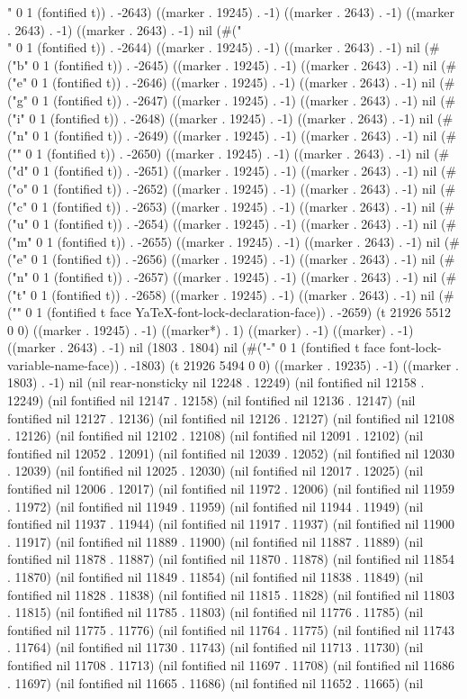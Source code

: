 " 0 1 (fontified t)) . -2643) ((marker . 19245) . -1) ((marker . 2643) . -1) ((marker . 2643) . -1) ((marker . 2643) . -1) nil (#("\\" 0 1 (fontified t)) . -2644) ((marker . 19245) . -1) ((marker . 2643) . -1) nil (#("b" 0 1 (fontified t)) . -2645) ((marker . 19245) . -1) ((marker . 2643) . -1) nil (#("e" 0 1 (fontified t)) . -2646) ((marker . 19245) . -1) ((marker . 2643) . -1) nil (#("g" 0 1 (fontified t)) . -2647) ((marker . 19245) . -1) ((marker . 2643) . -1) nil (#("i" 0 1 (fontified t)) . -2648) ((marker . 19245) . -1) ((marker . 2643) . -1) nil (#("n" 0 1 (fontified t)) . -2649) ((marker . 19245) . -1) ((marker . 2643) . -1) nil (#("{" 0 1 (fontified t)) . -2650) ((marker . 19245) . -1) ((marker . 2643) . -1) nil (#("d" 0 1 (fontified t)) . -2651) ((marker . 19245) . -1) ((marker . 2643) . -1) nil (#("o" 0 1 (fontified t)) . -2652) ((marker . 19245) . -1) ((marker . 2643) . -1) nil (#("c" 0 1 (fontified t)) . -2653) ((marker . 19245) . -1) ((marker . 2643) . -1) nil (#("u" 0 1 (fontified t)) . -2654) ((marker . 19245) . -1) ((marker . 2643) . -1) nil (#("m" 0 1 (fontified t)) . -2655) ((marker . 19245) . -1) ((marker . 2643) . -1) nil (#("e" 0 1 (fontified t)) . -2656) ((marker . 19245) . -1) ((marker . 2643) . -1) nil (#("n" 0 1 (fontified t)) . -2657) ((marker . 19245) . -1) ((marker . 2643) . -1) nil (#("t" 0 1 (fontified t)) . -2658) ((marker . 19245) . -1) ((marker . 2643) . -1) nil (#("}" 0 1 (fontified t face YaTeX-font-lock-declaration-face)) . -2659) (t 21926 5512 0 0) ((marker . 19245) . -1) ((marker*) . 1) ((marker) . -1) ((marker) . -1) ((marker . 2643) . -1) nil (1803 . 1804) nil (#("-" 0 1 (fontified t face font-lock-variable-name-face)) . -1803) (t 21926 5494 0 0) ((marker . 19235) . -1) ((marker . 1803) . -1) nil (nil rear-nonsticky nil 12248 . 12249) (nil fontified nil 12158 . 12249) (nil fontified nil 12147 . 12158) (nil fontified nil 12136 . 12147) (nil fontified nil 12127 . 12136) (nil fontified nil 12126 . 12127) (nil fontified nil 12108 . 12126) (nil fontified nil 12102 . 12108) (nil fontified nil 12091 . 12102) (nil fontified nil 12052 . 12091) (nil fontified nil 12039 . 12052) (nil fontified nil 12030 . 12039) (nil fontified nil 12025 . 12030) (nil fontified nil 12017 . 12025) (nil fontified nil 12006 . 12017) (nil fontified nil 11972 . 12006) (nil fontified nil 11959 . 11972) (nil fontified nil 11949 . 11959) (nil fontified nil 11944 . 11949) (nil fontified nil 11937 . 11944) (nil fontified nil 11917 . 11937) (nil fontified nil 11900 . 11917) (nil fontified nil 11889 . 11900) (nil fontified nil 11887 . 11889) (nil fontified nil 11878 . 11887) (nil fontified nil 11870 . 11878) (nil fontified nil 11854 . 11870) (nil fontified nil 11849 . 11854) (nil fontified nil 11838 . 11849) (nil fontified nil 11828 . 11838) (nil fontified nil 11815 . 11828) (nil fontified nil 11803 . 11815) (nil fontified nil 11785 . 11803) (nil fontified nil 11776 . 11785) (nil fontified nil 11775 . 11776) (nil fontified nil 11764 . 11775) (nil fontified nil 11743 . 11764) (nil fontified nil 11730 . 11743) (nil fontified nil 11713 . 11730) (nil fontified nil 11708 . 11713) (nil fontified nil 11697 . 11708) (nil fontified nil 11686 . 11697) (nil fontified nil 11665 . 11686) (nil fontified nil 11652 . 11665) (nil 